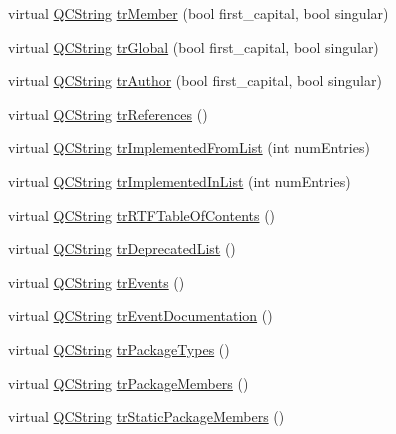 \begin{DoxyCompactItemize}
\item 
virtual \hyperlink{class_q_c_string}{Q\-C\-String} \hyperlink{class_translator_ukrainian_aaded5c915d8cd335abcd0e65e535cd71}{tr\-Member} (bool first\-\_\-capital, bool singular)
\item 
virtual \hyperlink{class_q_c_string}{Q\-C\-String} \hyperlink{class_translator_ukrainian_ac9f8f800abe2f721d9cf0bdfc9b6ec6f}{tr\-Global} (bool first\-\_\-capital, bool singular)
\item 
virtual \hyperlink{class_q_c_string}{Q\-C\-String} \hyperlink{class_translator_ukrainian_a8ce93b65c315fc4e942a1dc4cc80fa54}{tr\-Author} (bool first\-\_\-capital, bool singular)
\item 
virtual \hyperlink{class_q_c_string}{Q\-C\-String} \hyperlink{class_translator_ukrainian_a54eaa9a933568bfd7eaffe36b7872eb0}{tr\-References} ()
\item 
virtual \hyperlink{class_q_c_string}{Q\-C\-String} \hyperlink{class_translator_ukrainian_a01f548ba9f63fd42bc070ba1247e6543}{tr\-Implemented\-From\-List} (int num\-Entries)
\item 
virtual \hyperlink{class_q_c_string}{Q\-C\-String} \hyperlink{class_translator_ukrainian_aa2aa7d2d195ce999a256e7769605c0f0}{tr\-Implemented\-In\-List} (int num\-Entries)
\item 
virtual \hyperlink{class_q_c_string}{Q\-C\-String} \hyperlink{class_translator_ukrainian_aacd8ff5b2dcf79f4e8e72625d624a206}{tr\-R\-T\-F\-Table\-Of\-Contents} ()
\item 
virtual \hyperlink{class_q_c_string}{Q\-C\-String} \hyperlink{class_translator_ukrainian_af7a7f1e3eaf6bc4c1026cfb73fbf486a}{tr\-Deprecated\-List} ()
\item 
virtual \hyperlink{class_q_c_string}{Q\-C\-String} \hyperlink{class_translator_ukrainian_a43ec7331f50b74dc31b6d4e13879c93a}{tr\-Events} ()
\item 
virtual \hyperlink{class_q_c_string}{Q\-C\-String} \hyperlink{class_translator_ukrainian_afb5c66237dd5bce42714ec9616a29887}{tr\-Event\-Documentation} ()
\item 
virtual \hyperlink{class_q_c_string}{Q\-C\-String} \hyperlink{class_translator_ukrainian_a835fa6d7f51082a0d730d4759cbc5999}{tr\-Package\-Types} ()
\item 
virtual \hyperlink{class_q_c_string}{Q\-C\-String} \hyperlink{class_translator_ukrainian_a595a1ba7b4f631a384b17e3c2084e271}{tr\-Package\-Members} ()
\item 
virtual \hyperlink{class_q_c_string}{Q\-C\-String} \hyperlink{class_translator_ukrainian_a8f144cf1daf28327dec2fe32c7fcb020}{tr\-Static\-Package\-Members} ()

\end{DoxyCompactItemize}
